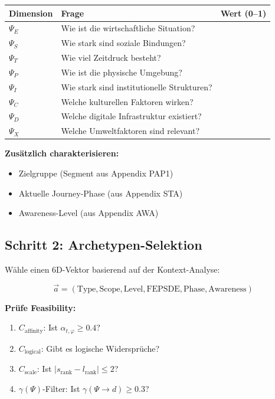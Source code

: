 \begin{center}
\begin{tabular}{@{}lll@{}}
\toprule
\textbf{Dimension} & \textbf{Frage} & \textbf{Wert (0--1)} \\
\midrule
$\Psi_E$ & Wie ist die wirtschaftliche Situation? & \\
$\Psi_S$ & Wie stark sind soziale Bindungen? & \\
$\Psi_T$ & Wie viel Zeitdruck besteht? & \\
$\Psi_P$ & Wie ist die physische Umgebung? & \\
$\Psi_I$ & Wie stark sind institutionelle Strukturen? & \\
$\Psi_C$ & Welche kulturellen Faktoren wirken? & \\
$\Psi_D$ & Welche digitale Infrastruktur existiert? & \\
$\Psi_X$ & Welche Umweltfaktoren sind relevant? & \\
\bottomrule
\end{tabular}
\end{center}

\textbf{Zusätzlich charakterisieren:}
\begin{itemize}[nosep]
\item Zielgruppe (Segment aus Appendix PAP1)
\item Aktuelle Journey-Phase (aus Appendix STA)
\item Awareness-Level (aus Appendix AWA)
\end{itemize}


\subsection{Schritt 2: Archetypen-Selektion}

Wähle einen 6D-Vektor basierend auf der Kontext-Analyse:

\begin{equation}
\vec{a} = (\text{Type}, \text{Scope}, \text{Level}, \text{FEPSDE}, \text{Phase}, \text{Awareness})
\end{equation}

\textbf{Prüfe Feasibility:}
\begin{enumerate}[nosep]
\item $C_{\text{affinity}}$: Ist $\alpha_{t,\varphi} \geq 0.4$?
\item $C_{\text{logical}}$: Gibt es logische Widersprüche?
\item $C_{\text{scale}}$: Ist $|s_{\text{rank}} - l_{\text{rank}}| \leq 2$?
\item $\gamma(\Psi)$-Filter: Ist $\gamma(\Psi \rightarrow d) \geq 0.3$?
\end{enumerate}

